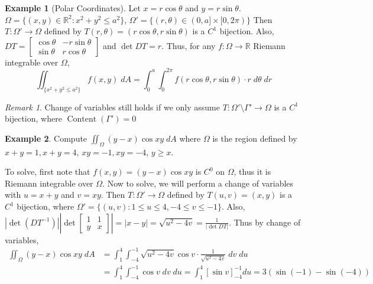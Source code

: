 \documentclass[11pt]{article}
\theoremstyle{definition}
\newtheorem{exmp}{Example}[section]
\theoremstyle{definition}
\newcommand{\R}[0]{\mathbb{R}}
\DeclareMathOperator{\Content}{Content}
\theoremstyle{definition}
\theoremstyle{remark}
\newtheorem*{remark}{Remark}
\begin{document}
\begin{exmp}[Polar Coordinates]
    Let $x = r \cos \theta$ and $y = r \sin \theta$. $\Omega = \{ (x, y) \in \R^2 : x^2 + y^2 \leq a^2 \}$, $\Omega' = \{(r, \theta) \in (0, a] \times [0, 2 \pi)\}$
    Then $T : \Omega' \to \Omega$ defined by $T(r, \theta) = (r \cos \theta, r \sin \theta)$ is a $C^1$ bijection. Also, $DT = \begin{bmatrix}
        \cos \theta & -r \sin \theta \\
        \sin \theta & r \cos \theta
    \end{bmatrix} $ and $\det DT = r$. Thus, for any $f : \Omega \to \R$ Riemann integrable over $\Omega$,
    \[
        \iint_{\{x^2 + y^2 \leq a^2\}} f(x,y) \; dA = \int_{0}^{a} \int_{0}^{2\pi} f(r \cos \theta, r \sin \theta) \cdot r \; d\theta \; dr
    \]   
\end{exmp}
\begin{remark}
    Change of variables still holds if we only assume $T : \Omega' \setminus \Gamma' \to \Omega$ is a $C^1$ bijection, where $\Content(\Gamma') = 0$  
\end{remark}

\begin{exmp}
    Compute $\iint_{\Omega} (y-x) \cos xy \; dA$ where $\Omega$ is the region defined by $x + y = 1, x + y = 4$, $xy = -1, xy =-4$, $y \geq x$.
    
    To solve, first note that $f(x,y) = (y-x) \cos xy$ is $C^0$ on $\Omega$, thus it is Riemann integrable over $\Omega$.
    Now to solve, we will perform a change of variables with $u = x + y$ and $v = xy$. Then
    $T : \Omega' \to \Omega$ defined by $T(u, v) = (x, y)$ is a $C^1$ bijection, where $\Omega' = \{(u,v) : 1 \leq u \leq 4, -4 \leq v \leq -1\}$.
    Also, $|\det (DT^{-1})| |\det \begin{bmatrix}
        1 & 1 \\
        y & x
    \end{bmatrix}| = |x - y| = \sqrt{u^2 - 4v} = \frac{1}{|\det DT|}$. Thus by change of variables,
    \begin{align*}
        \iint_{\Omega} (y-x) \cos xy \; dA &= \int_{1}^{4} \int_{-4}^{-1} \sqrt{u^2 - 4v} \cos v \cdot \frac{1}{\sqrt{u^2 - 4v}} \; dv \; du \\
        &= \int_{1}^{4} \int_{-4}^{-1} \cos v \; dv \; du = \int_{1}^{4} \left[ \sin v \right]_{-4}^{-1} du = 3(\sin (-1) - \sin(-4))
    \end{align*}
\end{exmp}
\end{document}
